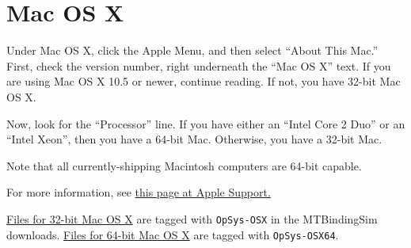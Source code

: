 \section{Mac OS X%
  \label{mac-os-x}%
}

\noindent{}

Under Mac OS X, click the Apple Menu, and then select ``About This Mac.''
First, check the version number, right underneath the ``Mac OS X'' text.
If you are using Mac OS X 10.5 or newer, continue reading.  If not, you
have 32-bit Mac OS X.

Now, look for the ``Processor'' line.  If you have either an ``Intel Core 2
Duo'' or an ``Intel Xeon'', then you have a 64-bit Mac.  Otherwise, you have
a 32-bit Mac.

Note that all currently-shipping Macintosh computers are 64-bit capable.

For more information, see \href{http://support.apple.com/kb/ht3696}{this page at Apple Support.}

\href{http://code.google.com/p/mtbindingsim/downloads/list?q=OpSys-OSX}{Files for 32-bit Mac OS X}
are tagged with \texttt{OpSys-OSX} in the MTBindingSim downloads. \href{http://code.google.com/p/mtbindingsim/downloads/list?q=OpSys-OSX64}{Files for 64-bit
Mac OS X}
are tagged with \texttt{OpSys-OSX64}.

